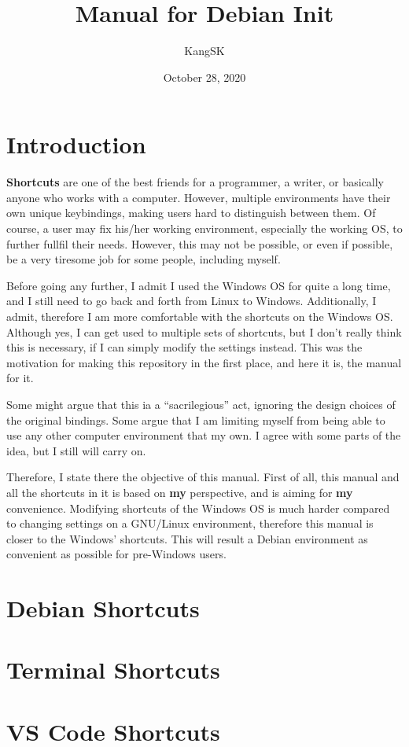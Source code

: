 \documentclass[10pt]{article}
\title{Manual for Debian Init}
\author{KangSK}
\date{October 28, 2020}
\begin{document}
\doublespacing

\maketitle\label{Title}

\section*{Introduction}

	\textbf{Shortcuts} are one of the best friends for a programmer, a writer, or basically anyone who works with a computer.
	However, multiple environments have their own unique keybindings, making users hard to distinguish between them.
	Of course, a user may fix his/her working environment, especially the working OS, to further fullfil their needs.
	However, this may not be possible, or even if possible, be a very tiresome job for some people, including myself.

	Before going any further, I admit I used the Windows OS for quite a long time, and I still need to go back and forth from Linux to Windows.
	Additionally, I admit, therefore I am more comfortable with the shortcuts on the Windows OS.
	Although yes, I can get used to multiple sets of shortcuts, but I don't really think this is necessary, if I can simply modify the settings instead.
	This was the motivation for making this repository in the first place, and here it is, the manual for it.

	Some might argue that this ia a ``sacrilegious'' act, ignoring the design choices of the original bindings.
	Some argue that I am limiting myself from being able to use any other computer environment that my own.
	I agree with some parts of the idea, but I still will carry on.

	Therefore, I state there the objective of this manual.
	First of all, this manual and all the shortcuts in it is based on \textbf{my} perspective, and is aiming for \textbf{my} convenience.
	Modifying shortcuts of the Windows OS is much harder compared to changing settings on a GNU/Linux environment, therefore this manual is closer to the Windows' shortcuts.
	This will result a Debian environment as convenient as possible for pre-Windows users.

	\newpage

\section{Debian Shortcuts}
\section{Terminal Shortcuts}
\section{VS Code Shortcuts}
\end{document}
